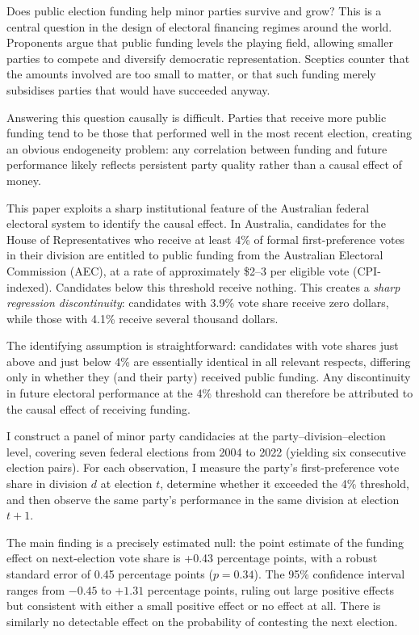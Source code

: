 \documentclass[12pt, a4paper]{article}
\begin{document}
Does public election funding help minor parties survive and grow? This is a central question in the design of electoral financing regimes around the world. Proponents argue that public funding levels the playing field, allowing smaller parties to compete and diversify democratic representation. Sceptics counter that the amounts involved are too small to matter, or that such funding merely subsidises parties that would have succeeded anyway.

Answering this question causally is difficult. Parties that receive more public funding tend to be those that performed well in the most recent election, creating an obvious endogeneity problem: any correlation between funding and future performance likely reflects persistent party quality rather than a causal effect of money.

This paper exploits a sharp institutional feature of the Australian federal electoral system to identify the causal effect. In Australia, candidates for the House of Representatives who receive at least 4\% of formal first-preference votes in their division are entitled to public funding from the Australian Electoral Commission (AEC), at a rate of approximately \$2--3 per eligible vote (CPI-indexed). Candidates below this threshold receive nothing. This creates a \emph{sharp regression discontinuity}: candidates with 3.9\% vote share receive zero dollars, while those with 4.1\% receive several thousand dollars.

The identifying assumption is straightforward: candidates with vote shares just above and just below 4\% are essentially identical in all relevant respects, differing only in whether they (and their party) received public funding. Any discontinuity in future electoral performance at the 4\% threshold can therefore be attributed to the causal effect of receiving funding.

I construct a panel of minor party candidacies at the party--division--election level, covering seven federal elections from 2004 to 2022 (yielding six consecutive election pairs). For each observation, I measure the party's first-preference vote share in division $d$ at election $t$, determine whether it exceeded the 4\% threshold, and then observe the same party's performance in the same division at election $t+1$.

The main finding is a precisely estimated null: the point estimate of the funding effect on next-election vote share is +0.43 percentage points, with a robust standard error of 0.45 percentage points ($p = 0.34$). The 95\% confidence interval ranges from $-0.45$ to $+1.31$ percentage points, ruling out large positive effects but consistent with either a small positive effect or no effect at all. There is similarly no detectable effect on the probability of contesting the next election.
\end{document}
